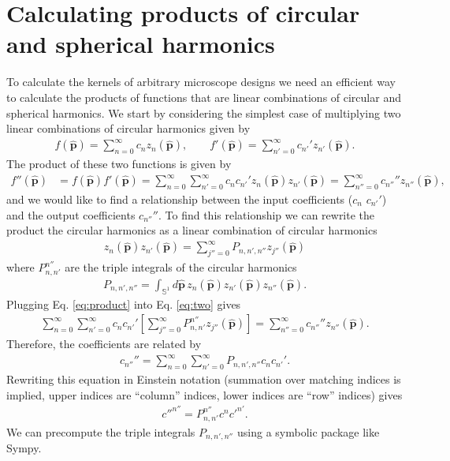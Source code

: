\documentclass[11pt]{article}
\providecommand{\mh}[1]{\mathbf{\hat{#1}}}
\providecommand{\mbb}[1]{\mathbb{#1}}
\begin{document}
\section{Calculating products of circular and spherical harmonics}
To calculate the kernels of arbitrary microscope designs we need an efficient
way to calculate the products of functions that are linear combinations of
circular and spherical harmonics. We start by considering the simplest case of
multiplying two linear combinations of circular harmonics given by
\begin{align}
  f(\mh{p}) = \sum_{n=0}^\infty c_nz_n(\mh{p}), \qquad f'(\mh{p}) = \sum_{n'=0}^\infty c_{n'}'z_{n'}(\mh{p}). 
\end{align}
The product of these two functions is given by 
\begin{align}
  f''(\mh{p}) &= f(\mh{p})f'(\mh{p})=\sum_{n=0}^\infty \sum_{n'=0}^\infty c_n c_{n'}' z_n(\mh{p}) z_{n'}(\mh{p}) = \sum_{n''=0}^{\infty} c_{n''}''z_{n''}(\mh{p}), \label{eq:two}
  \end{align}
  and we would like to find a relationship between the input coefficients ($c_n$
  $c_{n'}'$) and the output coefficients $c_{n''}''$. To find this relationship
  we can rewrite the product the circular harmonics as a linear combination of
  circular harmonics
  \begin{align}
    z_n(\mh{p})z_{n'}(\mh{p}) = \sum_{j''=0}^{\infty}P_{n,n',n''}z_{j''}(\mh{p})\label{eq:product}
  \end{align}
  where $P^{n''}_{n,n'}$ are the triple integrals of the circular harmonics
  \begin{align}
    P_{n,n',n''} = \int_{\mbb{S}^1}d\mh{p}\, z_{n}(\mh{p})z_{n'}(\mh{p})z_{n''}(\mh{p}).\label{eq:triple}
  \end{align}
  Plugging Eq. \ref{eq:product} into Eq. \ref{eq:two} gives
  \begin{align}
    \sum_{n=0}^\infty \sum_{n'=0}^\infty c_n c_{n'}' \left[\sum_{j''=0}^{\infty}P^{n''}_{n,n'}z_{j''}(\mh{p})\right] = \sum_{n''=0}^{\infty} c_{n''}''z_{n''}(\mh{p}).    
  \end{align}
  Therefore, the coefficients are related by
  \begin{align}
    c_{n''}'' = \sum_{n=0}^\infty \sum_{n'=0}^\infty P_{n,n',n''} c_n c_{n'}'.
  \end{align}
  Rewriting this equation in Einstein notation (summation over matching indices
  is implied, upper indices are ``column'' indices, lower indices are ``row''
  indices) gives
  \begin{align}
    {c''}^{n''} = P^{n''}_{n,n'} c^n {c'}^{n'}.
  \end{align}
  We can precompute the triple integrals $P_{n,n',n''}$ using a symbolic package
  like Sympy.
  
\end{document}
